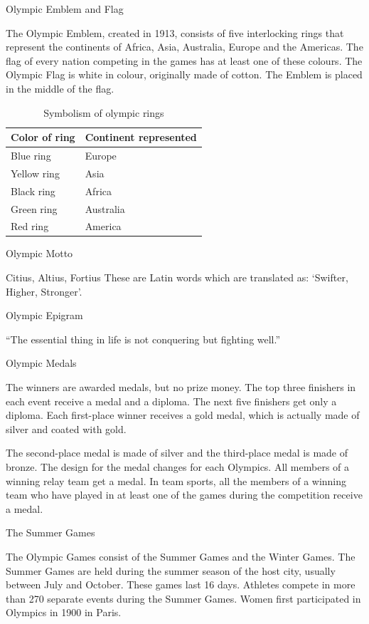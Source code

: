 \documentclass[
  openany]{book}
\begin{document}
Olympic Emblem and Flag

The Olympic Emblem, created in 1913, consists of five interlocking rings that represent the continents of Africa, Asia, Australia, Europe and the Americas. The flag of every nation competing in the games has at least one of these colours. The Olympic Flag is white in colour, originally made of cotton. The Emblem is placed in the middle of the flag.

\begin{table}

\caption{\label{tab:olympic-ring-symbolism}Symbolism of olympic rings}
\centering
\begin{tabular}[t]{ll}
\toprule
Color of ring & Continent represented\\
\midrule
\rowcolor{gray!6}  Blue ring & Europe\\
Yellow ring & Asia\\
\rowcolor{gray!6}  Black ring & Africa\\
Green ring & Australia\\
\rowcolor{gray!6}  Red ring & America\\
\bottomrule
\end{tabular}
\end{table}

Olympic Motto

Citius, Altius, Fortius These are Latin words which are translated as: `Swifter, Higher, Stronger'.

Olympic Epigram

``The essential thing in life is not conquering but fighting well.''

Olympic Medals

The winners are awarded medals, but no prize money. The top three finishers in each event receive a medal and a diploma. The next five finishers get only a diploma. Each first-place winner receives a gold medal, which is actually made of silver and coated with gold.

The second-place medal is made of silver and the third-place medal is made of bronze. The design for the medal changes for each Olympics. All members of a winning relay team get a medal. In team sports, all the members of a winning team who have played in at least one of the games during the competition receive a medal.

The Summer Games

The Olympic Games consist of the Summer Games and the Winter Games. The Summer Games are held during the summer season of the host city, usually between July and October. These games last 16 days. Athletes compete in more than 270 separate events during the Summer Games. Women first participated in Olympics in 1900 in Paris.
\end{document}
